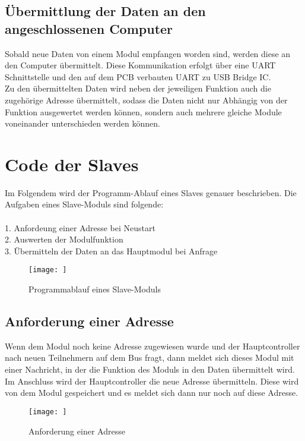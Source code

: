 

\subsection{Übermittlung der Daten an den angeschlossenen Computer}
\textmd{Sobald neue Daten von einem Modul empfangen worden sind, werden diese an den Computer übermittelt. Diese Kommunikation erfolgt über eine UART Schnittstelle und den auf dem PCB verbauten UART zu USB Bridge IC. \\
Zu den übermittelten Daten wird neben der jeweiligen Funktion auch die zugehörige Adresse übermittelt, sodass die Daten nicht nur Abhängig von der Funktion ausgewertet werden können, sondern auch mehrere gleiche Module voneinander unterschieden werden können.  
}


\section{Code der Slaves}
\textmd{Im Folgendem wird der Programm-Ablauf eines Slaves genauer beschrieben. Die Aufgaben eines Slave-Moduls sind folgende:\\\\
1. Anfordeung einer Adresse bei Neustart\\
2. Auswerten der Modulfunktion\\
3. Übermitteln der Daten an das Hauptmodul bei Anfrage\\
}
\begin{figure}[H]
    \centering    
    \texttt{[image: ]}
    \caption{Programmablauf eines Slave-Moduls}
    \label{Programm_Slaves}
\end{figure}
\subsection{Anforderung einer Adresse}
\textmd{Wenn dem Modul noch keine Adresse zugewiesen wurde und der Hauptcontroller nach neuen Teilnehmern auf dem Bus fragt, dann meldet sich dieses Modul mit einer Nachricht, in der die Funktion des Moduls in den Daten übermittelt wird.\\
Im Anschluss wird der Hauptcontroller die neue Adresse übermitteln. Diese wird von dem Modul gespeichert und es meldet sich dann nur noch auf diese Adresse.
}
\begin{figure}[H]
    \centering    
    \texttt{[image: ]}
    \caption{Anforderung einer Adresse}
    \label{getAdress()}
\end{figure}

